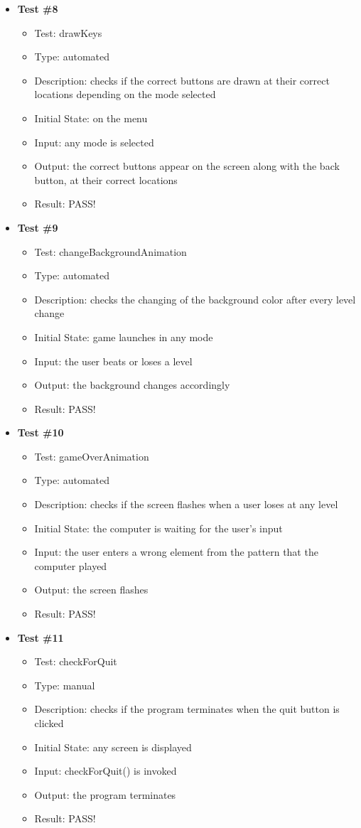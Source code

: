 \documentclass[12pt, titlepage]{article}
\begin{document}
\begin{itemize}
\item \textbf {Test \#8}
\begin{itemize}
\item{Test: drawKeys}
\item{Type: automated}
\item{Description: checks if the correct buttons are drawn at their correct locations depending on the mode selected}
\item{Initial State: on the menu}
\item{Input: any mode is selected}
\item{Output: the correct buttons appear on the screen along with the back button, at their correct locations}
\item{Result: PASS!}
\end{itemize}

\item \textbf {Test \#9}
\begin{itemize}
\item{Test: changeBackgroundAnimation}
\item{Type: automated}
\item{Description: checks the changing of the background color after every level change}
\item{Initial State: game launches in any mode}
\item{Input: the user beats or loses a level}
\item{Output: the background changes accordingly}
\item{Result: PASS!}
\end{itemize}

\item \textbf {Test \#10}
\begin{itemize}
\item{Test: gameOverAnimation}
\item{Type: automated}
\item{Description: checks if the screen flashes when a user loses at any level}
\item{Initial State: the computer is waiting for the user's input}
\item{Input: the user enters a wrong element from the pattern that the computer played}
\item{Output: the screen flashes}
\item{Result: PASS!}
\end{itemize}

\item \textbf {Test \#11}
\begin{itemize}
\item{Test: checkForQuit}
\item{Type: manual}
\item{Description: checks if the program terminates when the quit button is clicked}
\item{Initial State: any screen is displayed}
\item{Input: checkForQuit() is invoked}
\item{Output: the program terminates}
\item{Result: PASS!}
\end{itemize}

\end{itemize}
\end{document}
